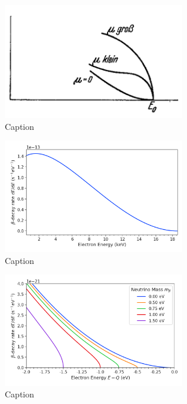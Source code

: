\begin{figure}[htbp]
    \centering
    \includegraphics[width=0.7\textwidth]{figs/Chapter-2/Fermi.png}
    \caption{Caption}
    \label{fig:fermi_original_b_spectrum}
\end{figure}

\begin{figure}[htbp]
    \centering
    \includegraphics[width=0.7\textwidth]{figs/Chapter-2/230302_atomic_tritium_spectrum.png}
    \caption{Caption}
    \label{fig:atomic_tritium_spectrum}
\end{figure}

\begin{figure}[htbp]
    \centering
    \includegraphics[width=0.7\textwidth]{figs/Chapter-2/230302_atomic_tritium_spectrum_near_endpoint.png}
    \caption{Caption}
    \label{fig:atomic_tritium_endpoint}
\end{figure}
